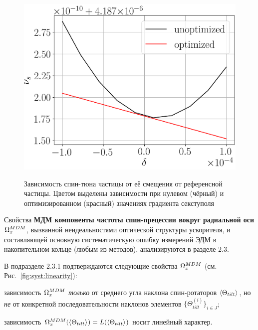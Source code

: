 \begin{figure}[H]
\begin{minipage}{.5\linewidth}
{		\includegraphics[height=.2\paperheight]{images/decoh_sim/spin_tune_decoh_d_offset_1}}
	\end{minipage}%
	\begin{minipage}{.5\linewidth}
	\caption{Зависимость спин-тюна частицы от её смещения от референсной частицы.\label{fig:decoh:perfect}
	Цветом выделены зависимости при нулевом (чёрный) и оптимизированном (красный) значениях градиента секступоля}
	\end{minipage}
\end{figure}

Свойства \textbf{МДМ компоненты частоты спин-прецессии вокруг радиальной оси} $\Omega_x^{MDM}$, вызванной 
неидеальностями оптической структуры ускорителя, и составляющей основную 
систематическую ошибку измерений ЭДМ в накопительном кольце (любым из методов), анализируются в разделе 2.3.

В подразделе 2.3.1 подтверждаются следующие свойства $\Omega_x^{MDM}$ (см. Рис.~\ref{fig:syst:linearity}):
\begin{enumerate*}[(1)]
	\item зависимость $\Omega_x^{MDM}$ \emph{только} от среднего угла наклона спин-ротаторов $\avg{\Theta_{tilt}}$, 
	но \emph{не} от конкретной последовательности наклонов элементов $\{\Theta_{tilt}^{(i)}\}_{i\in J}$;
	\item зависимость $\W_x^{MDM}(\avg{\Theta_{tilt}}) = L(\avg{\Theta_{tilt}})$ носит линейный характер.
\end{enumerate*}

